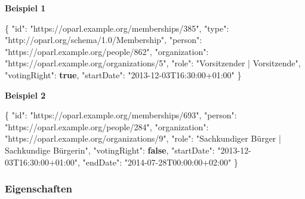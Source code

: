 \documentclass[,a4paper]{article}
\newenvironment{Shaded}{}{}
\newcommand{\KeywordTok}[1]{\textcolor[rgb]{0.00,0.44,0.13}{\textbf{{#1}}}}
\newcommand{\DataTypeTok}[1]{\textcolor[rgb]{0.56,0.13,0.00}{{#1}}}
\newcommand{\StringTok}[1]{\textcolor[rgb]{0.25,0.44,0.63}{{#1}}}
\newcommand{\FunctionTok}[1]{\textcolor[rgb]{0.02,0.16,0.49}{{#1}}}
\begin{document}
\textbf{Beispiel 1}

\begin{Shaded}
\begin{Highlighting}[]
\FunctionTok{\{}
    \DataTypeTok{"id"}\FunctionTok{:} \StringTok{"https://oparl.example.org/memberships/385"}\FunctionTok{,}
    \DataTypeTok{"type"}\FunctionTok{:} \StringTok{"http://oparl.org/schema/1.0/Membership"}\FunctionTok{,}
    \DataTypeTok{"person"}\FunctionTok{:} \StringTok{"https://oparl.example.org/people/862"}\FunctionTok{,}
    \DataTypeTok{"organization"}\FunctionTok{:} \StringTok{"https://oparl.example.org/organizations/5"}\FunctionTok{,}
    \DataTypeTok{"role"}\FunctionTok{:} \StringTok{"Vorsitzender | Vorsitzende"}\FunctionTok{,}
    \DataTypeTok{"votingRight"}\FunctionTok{:} \KeywordTok{true}\FunctionTok{,}
    \DataTypeTok{"startDate"}\FunctionTok{:} \StringTok{"2013-12-03T16:30:00+01:00"}
\FunctionTok{\}}
\end{Highlighting}
\end{Shaded}

\textbf{Beispiel 2}

\begin{Shaded}
\begin{Highlighting}[]
\FunctionTok{\{}
    \DataTypeTok{"id"}\FunctionTok{:} \StringTok{"https://oparl.example.org/memberships/693"}\FunctionTok{,}
    \DataTypeTok{"person"}\FunctionTok{:} \StringTok{"https://oparl.example.org/people/284"}\FunctionTok{,}
    \DataTypeTok{"organization"}\FunctionTok{:} \StringTok{"https://oparl.example.org/organizations/9"}\FunctionTok{,}
    \DataTypeTok{"role"}\FunctionTok{:} \StringTok{"Sachkundiger Bürger | Sachkundige Bürgerin"}\FunctionTok{,}
    \DataTypeTok{"votingRight"}\FunctionTok{:} \KeywordTok{false}\FunctionTok{,}
    \DataTypeTok{"startDate"}\FunctionTok{:} \StringTok{"2013-12-03T16:30:00+01:00"}\FunctionTok{,}
    \DataTypeTok{"endDate"}\FunctionTok{:} \StringTok{"2014-07-28T00:00:00+02:00"}
\FunctionTok{\}}
\end{Highlighting}
\end{Shaded}

\subsubsection{Eigenschaften}\label{eigenschaften-10}
\end{document}
